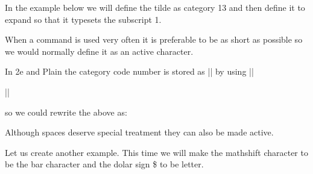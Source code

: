 In the example below we will define the tilde as category 13 and then define it to expand so that it typesets the subscript 1.




When a command is used very often it is preferable to be as short as possible so we would normally define it as an active character. 

In \latex2e and Plain the category code number is stored as |\active| by using |\chardef|

|\chardef{}|

so we could rewrite the above as:


Although spaces deserve special treatment they can also be made active.


Let us create another example. This time we will make the mathshift character to be the bar {\textbar} character and the dolar sign \$ to be letter.


